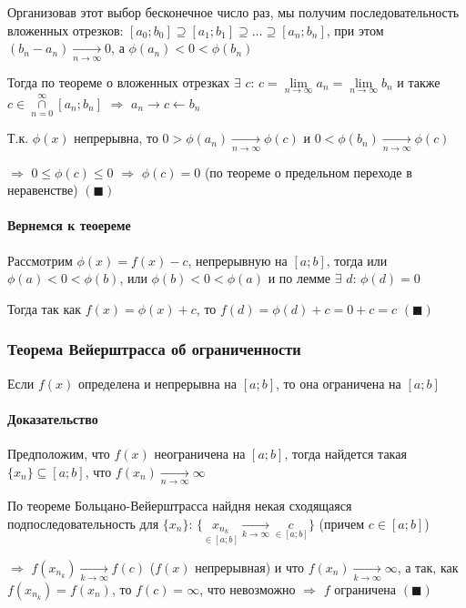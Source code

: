 \documentclass[class=article,a4paper,12pt,crop=false]{standalone}
\begin{document}
Организовав этот выбор бесконечное число раз, мы получим последовательность вложенных отрезков:
$[a_0; b_0] \supseteq [a_1; b_1] \supseteq \dots \supseteq [a_n; b_n]$, при этом
$(b_n - a_n) \underset{n \rightarrow \infty}{\rightarrow} 0$, а $\phi(a_n) < 0 < \phi(b_n)$

Тогда по теореме о вложенных отрезках $\exists$ $c$: 
$c = \lim\limits_{n \rightarrow \infty}a_n = \lim\limits_{n \rightarrow \infty}b_n$ и также
$c \in \overset{\infty}{\underset{n = 0}{\cap}}[a_n; b_n]$
$\Rightarrow$ $a_n \rightarrow c \leftarrow b_n$

Т.к. $\phi(x)$ непрерывна, то $0 > \phi(a_n) \underset{n \rightarrow \infty}{\rightarrow} \phi(c)$
и $0 < \phi(b_n) \underset{n \rightarrow \infty}{\rightarrow} \phi(c)$

$\Rightarrow$ $0 \leq \phi(c) \leq 0$ $\Rightarrow$ $\phi(c) = 0$ (по теореме о предельном переходе
в неравенстве) $(\blacksquare)$

\paragraph{Вернемся к теоереме} Рассмотрим $\phi(x) = f(x) - c$, непрерывную на $[a; b]$,
тогда или $\phi(a) < 0 < \phi(b)$, или $\phi(b) < 0 < \phi(a)$ и по лемме $\exists$ $d$:
$\phi(d) = 0$

Тогда так как $f(x) = \phi(x) + c$, то $f(d) = \phi(d) + c = 0 + c = c$ $(\blacksquare)$

\subsubsection{Теорема Вейерштрасса об ограниченности}

Если $f(x)$ определена и непрерывна на $[a; b]$, то она ограничена на $[a; b]$

\paragraph{Доказательство} Предположим, что $f(x)$ неограничена на $[a; b]$, тогда
найдется такая $\{x_n\} \subseteq [a; b]$, что $f(x_n) \underset{n \rightarrow \infty}{\rightarrow} \infty$

По теореме Больцано-Вейерштрасса найдня некая сходящаяся подпоследовательность для $\{x_n\}$:
$\{\underset{\in [a; b]}{x_{n_k}} \underset{k \rightarrow \infty}{\rightarrow} \underset{\in [a; b]}{c}\}$
(причем $c \in [a; b]$)

$\Rightarrow$ $f(x_{n_k}) \underset{k \rightarrow \infty}{\rightarrow} f(c)$ ($f(x)$ непрерывная) и что
$f(x_n) \underset{k \rightarrow \infty}{\rightarrow} \infty$, а так, как $f(x_{n_k}) = f(x_n)$, то
$f(c) = \infty$, что невозможно
$\Rightarrow$ $f$ ограничена $(\blacksquare)$
\end{document}
